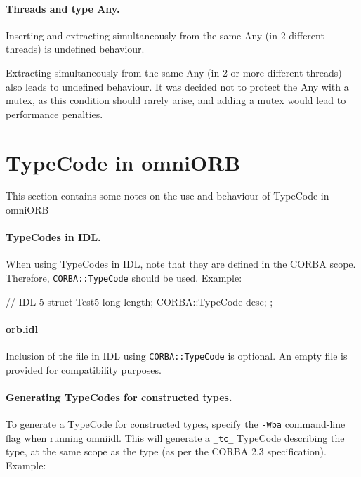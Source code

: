 \documentclass[11pt,twoside,a4paper]{book}
\newcommand{\type}[1]{\texttt{#1}}
\newcommand{\code}[1]{\texttt{#1}}
\newcommand{\file}{\begingroup \urlstyle{tt}\Url}
\begin{document}
\paragraph*{Threads and type Any.}
Inserting and extracting simultaneously from the same Any (in 2
different threads) is undefined behaviour.

Extracting simultaneously from the same Any (in 2 or more different
threads) also leads to undefined behaviour.  It was decided not to
protect the Any with a mutex, as this condition should rarely arise,
and adding a mutex would lead to performance penalties.


\section{TypeCode in omniORB}

This section contains some notes on the use and behaviour of TypeCode
in omniORB

\paragraph*{TypeCodes in IDL.}

When using TypeCodes in IDL, note that they are defined in the CORBA
scope.  Therefore, \type{CORBA::TypeCode} should be used. Example:

\begin{idllisting}
// IDL 5
struct Test5 {
  long length;
  CORBA::TypeCode desc;
};
\end{idllisting}

\paragraph*{orb.idl}

Inclusion of the file \file{orb.idl} in IDL using
\type{CORBA::TypeCode} is optional.  An empty \file{orb.idl} file is
provided for compatibility purposes.

\paragraph*{Generating TypeCodes for constructed types.}

To generate a TypeCode for constructed types, specify the
\texttt{-Wba} command-line flag when running omniidl. This will
generate a \code{\_tc\_} TypeCode describing the type, at the same
scope as the type (as per the CORBA 2.3 specification). Example:
\end{document}
